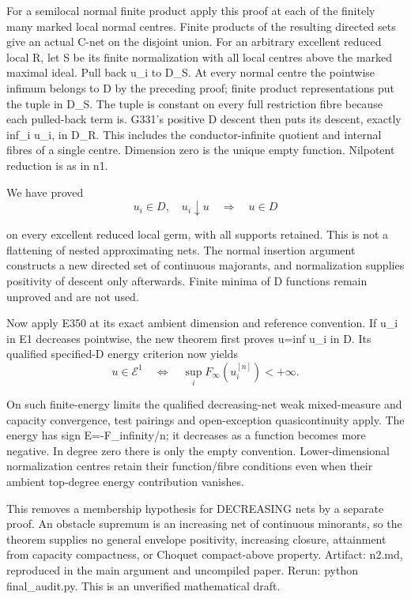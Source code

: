 \documentclass[11pt]{article}
\begin{document}
For a semilocal normal finite product apply this proof at each of the finitely many marked local normal centres. Finite products of the resulting directed sets give an actual C-net on the disjoint union. For an arbitrary excellent reduced local R, let S be its finite normalization with all local centres above the marked maximal ideal. Pull back u\_i to D\_S. At every normal centre the pointwise infimum belongs to D by the preceding proof; finite product representations put the tuple in D\_S. The tuple is constant on every full restriction fibre because each pulled-back term is. G331's positive D descent then puts its descent, exactly inf\_i u\_i, in D\_R. This includes the conductor-infinite quotient and internal fibres of a single centre. Dimension zero is the unique empty function. Nilpotent reduction is as in n1.

We have proved
\[
u_i\in D,\quad u_i\downarrow u\quad\Longrightarrow\quad u\in D
\]

on every excellent reduced local germ, with all supports retained. This is not a flattening of nested approximating nets. The normal insertion argument constructs a new directed set of continuous majorants, and normalization supplies positivity of descent only afterwards. Finite minima of D functions remain unproved and are not used.

Now apply E350 at its exact ambient dimension and reference convention. If u\_i in E1 decreases pointwise, the new theorem first proves u=inf u\_i in D. Its qualified specified-D energy criterion now yields
\[
u\in\mathcal E^1\quad\Longleftrightarrow\quad
\sup_i F_\infty(u_i^{[n]})<+\infty.
\]

On such finite-energy limits the qualified decreasing-net weak mixed-measure and capacity convergence, test pairings and open-exception quasicontinuity apply. The energy has sign E=-F\_infinity/n; it decreases as a function becomes more negative. In degree zero there is only the empty convention. Lower-dimensional normalization centres retain their function/fibre conditions even when their ambient top-degree energy contribution vanishes.

This removes a membership hypothesis for DECREASING nets by a separate proof. An obstacle supremum is an increasing net of continuous minorants, so the theorem supplies no general envelope positivity, increasing closure, attainment from capacity compactness, or Choquet compact-above property. Artifact: n2.md, reproduced in the main argument and uncompiled paper. Rerun: python final\_audit.py. This is an unverified mathematical draft.
\end{document}
